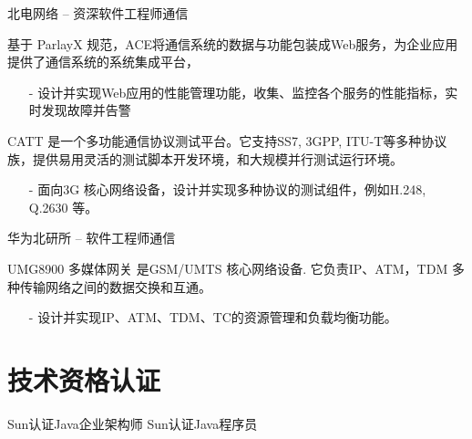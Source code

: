\documentclass[10pt,a4paper]{moderncv}
\begin{document}
{北电网络 -- 资深软件工程师}{通信}{}{}{}
{
  基于 ParlayX 规范，ACE将通信系统的数据与功能包装成Web服务，为企业应用提供了通信系统的系统集成平台，
  \begin{itemize}
    \item[-] 设计并实现Web应用的性能管理功能，收集、监控各个服务的性能指标，实时发现故障并告警 \end{itemize}
}

\vspace*{0.2\baselineskip}
{
  CATT 是一个多功能通信协议测试平台。它支持SS7, 3GPP, ITU-T等多种协议族，提供易用灵活的测试脚本开发环境，和大规模并行测试运行环境。
  \begin{itemize}
    \item[-] 面向3G 核心网络设备，设计并实现多种协议的测试组件，例如H.248, Q.2630 等。
  \end{itemize}
}

\vspace*{0.2\baselineskip}
\vspace*{0.2\baselineskip}
\vspace*{0.4\baselineskip}

{华为北研所 -- 软件工程师}{通信}{}{}{}

{
  UMG8900 多媒体网关 是GSM/UMTS 核心网络设备. 它负责IP、ATM，TDM 多种传输网络之间的数据交换和互通。
  \begin{itemize}
    \item[-] 设计并实现IP、ATM、TDM、TC的资源管理和负载均衡功能。
  \end{itemize}
}

\vspace*{0.4\baselineskip}


\section{技术资格认证}
{Sun认证Java企业架构师 }{}{}{}{}
\vspace*{0.4\baselineskip}
{Sun认证Java程序员 }{}{}{}{}

\end{document}
